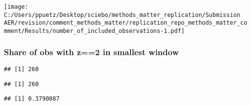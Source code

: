 \documentclass[
]{article}
\newenvironment{Shaded}{\begin{snugshade}}{\end{snugshade}}
\newcommand{\AttributeTok}[1]{\textcolor[rgb]{0.77,0.63,0.00}{#1}}
\newcommand{\ConstantTok}[1]{\textcolor[rgb]{0.00,0.00,0.00}{#1}}
\newcommand{\DecValTok}[1]{\textcolor[rgb]{0.00,0.00,0.81}{#1}}
\newcommand{\FloatTok}[1]{\textcolor[rgb]{0.00,0.00,0.81}{#1}}
\newcommand{\FunctionTok}[1]{\textcolor[rgb]{0.00,0.00,0.00}{#1}}
\newcommand{\NormalTok}[1]{#1}
\newcommand{\OtherTok}[1]{\textcolor[rgb]{0.56,0.35,0.01}{#1}}
\newcommand{\SpecialCharTok}[1]{\textcolor[rgb]{0.00,0.00,0.00}{#1}}
\begin{document}
\texttt{[image: C:/Users/ppuetz/Desktop/sciebo/methods\_matter\_replication/Submission AER/revision/comment\_methods\_matter/replication\_repo\_methods\_matter\_comment/Results/number\_of\_included\_observations-1.pdf]}

\hypertarget{share-of-obs-with-z2-in-smallest-window}{%
\subsubsection{Share of obs with z==2 in smallest
window}\label{share-of-obs-with-z2-in-smallest-window}}

\begin{Shaded}
\end{Shaded}

\begin{verbatim}
## [1] 260
\end{verbatim}

\begin{Shaded}
\end{Shaded}

\begin{verbatim}
## [1] 260
\end{verbatim}

\begin{Shaded}
\end{Shaded}

\begin{verbatim}
## [1] 0.3790087
\end{verbatim}
\end{document}
